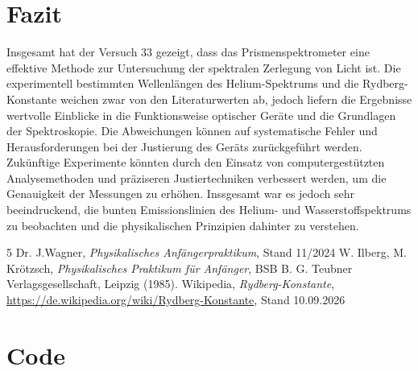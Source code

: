 \documentclass[12pt,a4paper,titlepage]{scrartcl}
\numberwithin{equation}{section}
\numberwithin{table}{section}
\numberwithin{figure}{section}
\begin{document}
\section{Fazit}
Insgesamt hat der Versuch 33 gezeigt, dass das Prismenspektrometer eine effektive Methode zur Untersuchung der spektralen Zerlegung von Licht ist. Die experimentell bestimmten Wellenlängen des Helium-Spektrums und die Rydberg-Konstante weichen zwar von den Literaturwerten ab, jedoch liefern die Ergebnisse wertvolle Einblicke in die Funktionsweise optischer Geräte und die Grundlagen der Spektroskopie. Die Abweichungen können auf systematische Fehler und Herausforderungen bei der Justierung des Geräts zurückgeführt werden. Zukünftige Experimente könnten durch den Einsatz von computergestützten Analysemethoden und präziseren Justiertechniken verbessert werden, um die Genauigkeit der Messungen zu erhöhen. Inssgesamt war es jedoch sehr beeindruckend, die bunten Emissionslinien des Helium- und Wasserstoffspektrums zu beobachten und die physikalischen Prinzipien dahinter zu verstehen. 

\clearpage

\listoffigures


\listoftables

\begin{thebibliography}{5}
     Dr. J.Wagner, \emph{Physikalisches Anfängerpraktikum}, Stand 11/2024
     W. Ilberg, M. Krötzsch, \emph{Physikalisches Praktikum für Anfänger}, BSB B. G. Teubner Verlagsgesellschaft, Leipzig (1985).
     Wikipedia, \emph{Rydberg-Konstante}, \\\url{https://de.wikipedia.org/wiki/Rydberg-Konstante}, Stand 10.09.2026
\end{thebibliography}

\appendix
\section{Code}

\end{document}
